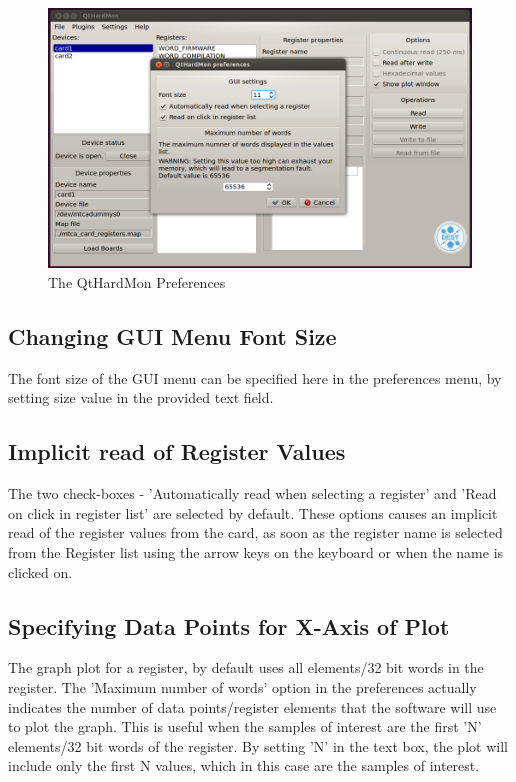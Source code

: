 \begin{figure}[htbp]
\centering
\includegraphics[width=1\textwidth]{images/preferences.png}
 \caption{The QtHardMon Preferences}
\label{qthardmon_preferences}			
\end{figure}

\subsection{Changing GUI Menu Font Size}
The font size of the GUI menu can be specified here in the preferences menu, by setting size value in the provided text field.

\subsection{Implicit read of Register Values}
The two check-boxes - 'Automatically read when selecting a register' and 'Read on click in register list' are selected by default. These options causes an implicit read of the register values from the card, as soon as the register name is selected from the Register list using the arrow keys on the keyboard or when the name is clicked on.

\subsection{Specifying Data Points for X-Axis of Plot}\label{subsub::graph_x_axis}
The graph plot for a register, by default uses all elements/32 bit words in the register. The 	'Maximum number of words' option in the preferences actually indicates the number of data points/register elements that the software will use to plot the graph. This is useful when the samples of interest are the first 'N' elements/32 bit words of the register. By setting 'N' in the text box, the plot will include only the first N values, which in this case are the samples of interest.
		
